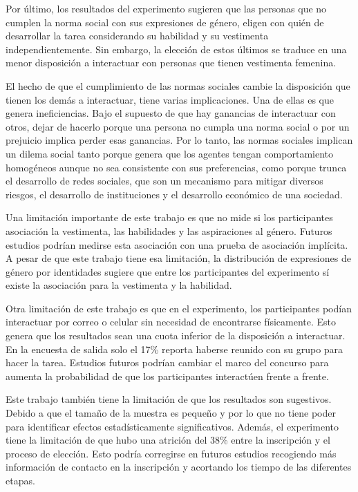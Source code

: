 Por último, los resultados del experimento sugieren que las personas que no cumplen la norma social con sus expresiones de género, eligen con quién de desarrollar la tarea considerando su habilidad y su vestimenta independientemente. Sin embargo, la elección de estos últimos se traduce en una menor disposición a interactuar con personas que tienen vestimenta femenina. 

El hecho de que el cumplimiento de las normas sociales cambie la disposición que tienen los demás a interactuar, tiene varias implicaciones. Una de ellas es que genera ineficiencias. Bajo el supuesto de que hay ganancias de interactuar con otros, dejar de hacerlo porque una persona no cumpla una norma social o por un prejuicio implica perder esas ganancias. Por lo tanto, las normas sociales implican un dilema social tanto porque genera que los agentes tengan comportamiento homogéneos aunque no sea consistente con sus preferencias, como porque trunca el desarrollo de redes sociales, que son un mecanismo para mitigar diversos riesgos, el desarrollo de instituciones y el desarrollo económico de una sociedad. 

Una limitación importante de este trabajo es que no mide si los participantes asociación la vestimenta, las habilidades y las aspiraciones al género. Futuros estudios podrían medirse esta asociación con una prueba de asociación implícita. A pesar de que este trabajo tiene esa limitación, la distribución de expresiones de género por identidades sugiere que entre los participantes del experimento sí existe la asociación para la vestimenta y la habilidad. 

Otra limitación de este trabajo es que en el experimento, los participantes podían interactuar por correo o celular sin necesidad de encontrarse físicamente. Esto genera que los resultados sean una cuota inferior de la disposición a interactuar. En la encuesta de salida solo el 17\% reporta haberse reunido con su grupo para hacer la tarea. Estudios futuros podrían cambiar el marco del concurso para aumenta la probabilidad de que los participantes interactúen frente a frente. 

Este trabajo también tiene la limitación de que los resultados son sugestivos. Debido a que el tamaño de la muestra es pequeño y por lo que no tiene poder para identificar efectos estadísticamente significativos. Además, el experimento tiene la limitación de que hubo una atrición del 38\% entre la inscripción y el proceso de elección. Esto podría corregirse en futuros estudios recogiendo más información de contacto en la inscripción y acortando los tiempo de las diferentes etapas. 